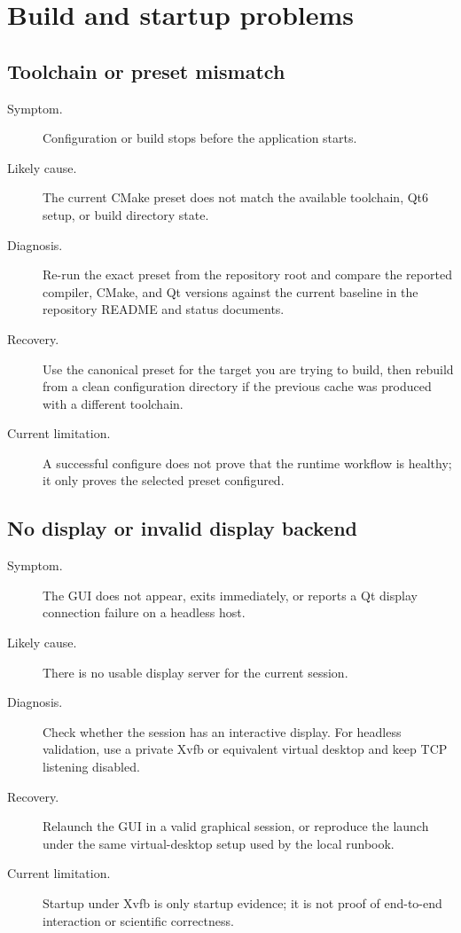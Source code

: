 \section{Build and startup problems}
\label{sec:troubleshooting-build-startup}

\subsection{Toolchain or preset mismatch}
\label{subsec:troubleshooting-toolchain}

\begin{description}
\item[Symptom.] Configuration or build stops before the application starts.
\item[Likely cause.] The current CMake preset does not match the available
toolchain, Qt6 setup, or build directory state.
\item[Diagnosis.] Re-run the exact preset from the repository root and compare
the reported compiler, CMake, and Qt versions against the current baseline in
the repository README and status documents.
\item[Recovery.] Use the canonical preset for the target you are trying to
build, then rebuild from a clean configuration directory if the previous cache
was produced with a different toolchain.
\item[Current limitation.] A successful configure does not prove that the
runtime workflow is healthy; it only proves the selected preset configured.
\end{description}

\subsection{No display or invalid display backend}
\label{subsec:troubleshooting-display}

\begin{description}
\item[Symptom.] The GUI does not appear, exits immediately, or reports a Qt
display connection failure on a headless host.
\item[Likely cause.] There is no usable display server for the current session.
\item[Diagnosis.] Check whether the session has an interactive display. For
headless validation, use a private Xvfb or equivalent virtual desktop and keep
TCP listening disabled.
\item[Recovery.] Relaunch the GUI in a valid graphical session, or reproduce
the launch under the same virtual-desktop setup used by the local runbook.
\item[Current limitation.] Startup under Xvfb is only startup evidence; it is
not proof of end-to-end interaction or scientific correctness.
\end{description}

